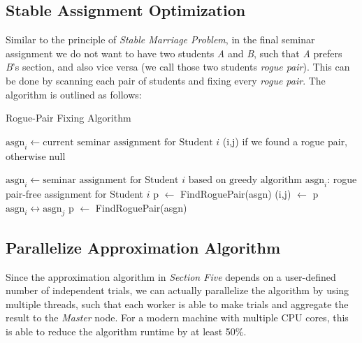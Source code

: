 \documentclass{article} %
\begin{document}
\subsection{Stable Assignment Optimization}
    \par\qquad Similar to the principle of \emph{Stable Marriage Problem}, in the final seminar assignment we do not want to have two students \emph{A} and \emph{B}, such that \emph{A} prefers \emph{B}'s section, and also vice versa (we call those two students \emph{rogue pair}). This can be done by scanning each pair of students and fixing every \emph{rogue pair}. The algorithm is outlined as follows:
    \begin{algorithm}
        \caption{Rogue-Pair Fixing Algorithm}
        \begin{algorithmic}
        \Require $\text{asgn}_i \gets \text{current seminar assignment for Student $i$}$
        \Ensure (i,j) if we found a rogue pair, otherwise null
                    \EndIf
                \EndFor
            \EndFor
        \EndFunction
        
        \null
        
        \Require $\text{asgn}_i \gets \text{seminar assignment for Student $i$ based on greedy algorithm}$
        \Ensure $\text{asgn}_i$: rogue pair-free assignment for Student $i$
                \State p $\gets$ FindRoguePair(asgn)
                    \State (i,j) $\gets$ p
                    \State $\text{asgn}_i \leftrightarrow \text{asgn}_j$
                    \State p $\gets$ FindRoguePair(asgn)
                \EndWhile
        
        \end{algorithmic}
    \end{algorithm}
    
\subsection{Parallelize Approximation Algorithm}
    \par\qquad Since the approximation algorithm in \emph{Section Five} depends on a user-defined number of independent trials, we can actually parallelize the algorithm by using multiple threads, such that each worker is able to make trials and aggregate the result to the \emph{Master} node. For a modern machine with multiple CPU cores, this is able to reduce the algorithm runtime by at least 50\%.
\end{document}
